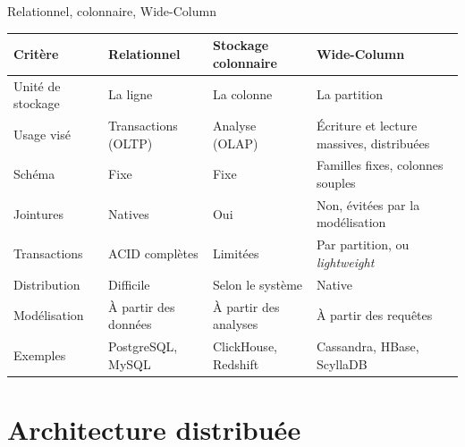 \documentclass[aspectratio=169,10pt]{beamer}
\begin{document}
\begin{frame}{Relationnel, colonnaire, Wide-Column}
  \small
  \begin{tabularx}{\textwidth}{@{}>{\raggedright\arraybackslash}p{2.8cm}>{\raggedright\arraybackslash}X>{\raggedright\arraybackslash}X>{\raggedright\arraybackslash}X@{}}
    \toprule
    Critère & Relationnel & Stockage colonnaire & Wide-Column \\
    \midrule
    Unité de stockage & La ligne & La colonne & La partition \\
    Usage visé & Transactions (OLTP) & Analyse (OLAP) & Écriture et lecture massives, distribuées \\
    Schéma & Fixe & Fixe & Familles fixes, colonnes souples \\
    Jointures & Natives & Oui & Non, évitées par la modélisation \\
    Transactions & ACID complètes & Limitées & Par partition, ou \emph{lightweight} \\
    Distribution & Difficile & Selon le système & Native \\
    Modélisation & À partir des données & À partir des analyses & À partir des requêtes \\
    Exemples & PostgreSQL, MySQL & ClickHouse, Redshift & Cassandra, HBase, ScyllaDB \\
    \bottomrule
  \end{tabularx}
\end{frame}

\section{Architecture distribuée}
\end{document}
